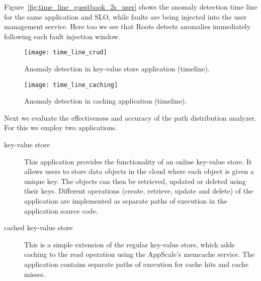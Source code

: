 Figure~\ref{fig:time_line_guestbook_2s_user} shows the anomaly detection time line for the 
same application and SLO, while faults are being injected into the user management service.
Here too we see that Roots detects anomalies immediately following each fault injection window.

\begin{figure}
\centering
\texttt{[image: time\_line\_crud]}
\caption{Anomaly detection in key-value store application (timeline).}
\label{fig:time_line_crud}
\end{figure}

\begin{figure}
\centering
\texttt{[image: time\_line\_caching]}
\caption{Anomaly detection in caching application (timeline).}
\label{fig:time_line_caching}
\end{figure}

Next we evaluate the effectiveness and accuracy of the path distribution analyzer. For this we 
employ two applications.
\begin{description}
\item[key-value store] This application provides the functionality of an online key-value store.  It allows 
users to store data objects in the cloud where each object is given a unique key. The objects can then be 
retrieved, updated or deleted using their keys. Different operations
(create, retrieve, update and delete) of the application are implemented as separate paths of
execution in the application source code.
\item[cached key-value store] This is a simple extension of the regular key-value store, which adds
caching to the read operation using the AppScale's memcache service. The application contains
separate paths of execution for cache hits and cache misses.
\end{description}

